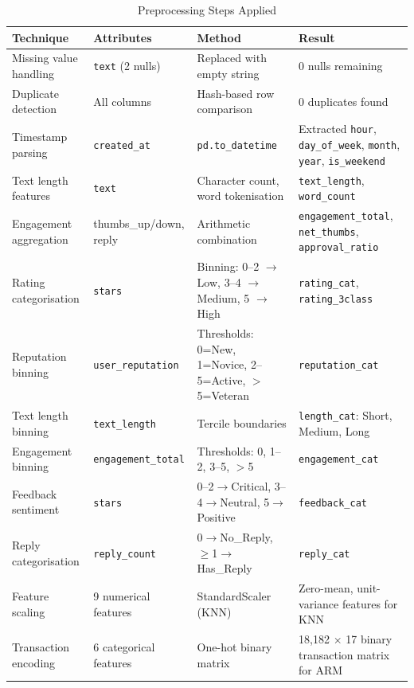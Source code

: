 \documentclass[12pt,a4paper]{article}
\begin{document}
\begin{table}[H]
\centering
\caption{Preprocessing Steps Applied}
\label{tab:preprocessing}
\small
\begin{tabularx}{\textwidth}{l l l X}
\toprule
\textbf{Technique} & \textbf{Attributes} & \textbf{Method} & \textbf{Result} \\
\midrule
Missing value handling & \texttt{text} (2 nulls) & Replaced with empty string & 0 nulls remaining \\
Duplicate detection & All columns & Hash-based row comparison & 0 duplicates found \\
Timestamp parsing & \texttt{created\_at} & \texttt{pd.to\_datetime} & Extracted \texttt{hour}, \texttt{day\_of\_week}, \texttt{month}, \texttt{year}, \texttt{is\_weekend} \\
Text length features & \texttt{text} & Character count, word tokenisation & \texttt{text\_length}, \texttt{word\_count} \\
Engagement aggregation & thumbs\_up/down, reply & Arithmetic combination & \texttt{engagement\_total}, \texttt{net\_thumbs}, \texttt{approval\_ratio} \\
Rating categorisation & \texttt{stars} & Binning: 0--2 $\to$ Low, 3--4 $\to$ Medium, 5 $\to$ High & \texttt{rating\_cat}, \texttt{rating\_3class} \\
Reputation binning & \texttt{user\_reputation} & Thresholds: 0=New, 1=Novice, 2--5=Active, $>$5=Veteran & \texttt{reputation\_cat} \\
Text length binning & \texttt{text\_length} & Tercile boundaries & \texttt{length\_cat}: Short, Medium, Long \\
Engagement binning & \texttt{engagement\_total} & Thresholds: 0, 1--2, 3--5, $>$5 & \texttt{engagement\_cat} \\
Feedback sentiment & \texttt{stars} & 0--2$\to$Critical, 3--4$\to$Neutral, 5$\to$Positive & \texttt{feedback\_cat} \\
Reply categorisation & \texttt{reply\_count} & 0$\to$No\_Reply, $\geq$1$\to$Has\_Reply & \texttt{reply\_cat} \\
Feature scaling & 9 numerical features & StandardScaler (KNN) & Zero-mean, unit-variance features for KNN \\
Transaction encoding & 6 categorical features & One-hot binary matrix & 18{,}182 $\times$ 17 binary transaction matrix for ARM \\
\bottomrule
\end{tabularx}
\end{table}
\end{document}

